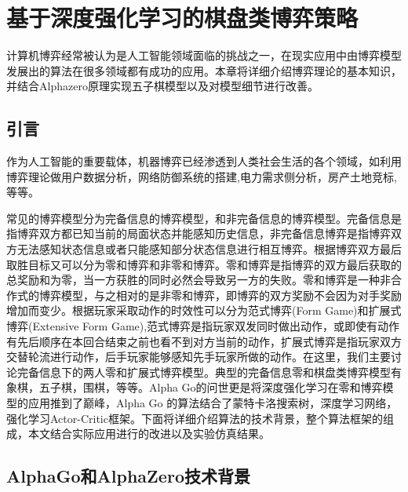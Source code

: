 \chapter{基于深度强化学习的棋盘类博弈策略}
计算机博弈经常被认为是人工智能领域面临的挑战之一，在现实应用中由博弈模型发展出的算法在很多领域都有成功的应用。本章将详细介绍博弈理论的基本知识，并结合Alphazero原理实现五子棋模型以及对模型细节进行改善。

\section{引言}
作为人工智能的重要载体，机器博弈已经渗透到人类社会生活的各个领域，如利用博弈理论做用户数据分析\cite{吴诚2017基于博弈论的大用户直购电双边决策研究}，网络防御系统的搭建\cite{许晓燕2018基于博弈模型的网络防御},电力需求侧分析\cite{刘晓峰2018博弈论在电力需求侧的应用研究综述}，房产土地竞标\cite{朱传军2011基于模糊测度与模糊积分的房地产评估方法与应用},等等。

常见的博弈模型分为完备信息的博弈模型，和非完备信息的博弈模型。完备信息是指博弈双方都已知当前的局面状态并能感知历史信息，非完备信息博弈是指博弈双方无法感知状态信息或者只能感知部分状态信息进行相互博弈。根据博弈双方最后取胜目标又可以分为零和博弈和非零和博弈。零和博弈是指博弈的双方最后获取的总奖励和为零，当一方获胜的同时必然会导致另一方的失败。零和博弈是一种非合作式的博弈模型，与之相对的是非零和博弈，即博弈的双方奖励不会因为对手奖励增加而变少。根据玩家采取动作的时效性可以分为范式博弈(Form Game)和扩展式博弈(Extensive Form Game),范式博弈是指玩家双发同时做出动作，或即使有动作有先后顺序在本回合结束之前也看不到对方当前的动作，扩展式博弈是指玩家双方交替轮流进行动作，后手玩家能够感知先手玩家所做的动作。在这里，我们主要讨论完备信息下的两人零和扩展式博弈模型。典型的完备信息零和棋盘类博弈模型有象棋，五子棋，围棋，等等。Alpha Go的问世更是将深度强化学习在零和博弈模型的应用推到了巅峰，Alpha Go 的算法结合了蒙特卡洛搜索树，深度学习网络，强化学习Actor-Critic框架。下面将详细介绍算法的技术背景，整个算法框架的组成，本文结合实际应用进行的改进以及实验仿真结果。
\section{AlphaGo和AlphaZero技术背景}

